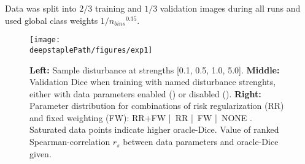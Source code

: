     Data was split into \(2/3\) training and \(1/3\) validation images during all runs and used global class weights \(1/{n_{bins}}^{0.35}\). %


    \begin{figure}
        \centering
        \texttt{[image: \\deepstaplePath/figures/exp1]}
        \caption{\textbf{Left:} Sample disturbance  at strengths [0.1, 0.5, 1.0, 5.0]. \textbf{Middle:} Validation Dice when training with named disturbance strenghts, either with data parameters enabled (\sampleline{}) or disabled (). \textbf{Right:} Parameter distribution for combinations of risk regularization (RR) and fixed weighting (FW): RR+FW  |~RR  |~FW   |~NONE . Saturated data points indicate higher oracle-Dice. Value of ranked Spearman-correlation \(r_s\) between data parameters and oracle-Dice given.}
        \label{fig:exp1_deepstaple}
    \end{figure}

